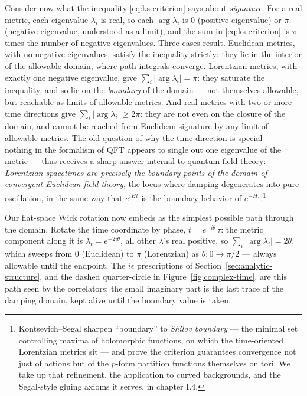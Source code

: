 \noin Consider now what the inequality \eqref{eq:ks-criterion} says about
\emph{signature}. For a real metric, each eigenvalue $\lambda_i$ is real, so
each $\arg\lambda_i$ is $0$ (positive eigenvalue) or $\pi$ (negative
eigenvalue, understood as a limit), and the sum in \eqref{eq:ks-criterion}
is $\pi$ times the number of negative eigenvalues. Three cases result.
Euclidean metrics, with no negative eigenvalues, satisfy the inequality
strictly: they lie in the interior of the allowable domain, where path
integrals converge. Lorentzian metrics, with exactly one negative
eigenvalue, give $\sum_i|\arg\lambda_i| = \pi$: they saturate the
inequality, and so lie on the \emph{boundary} of the domain --- not
themselves allowable, but reachable as limits of allowable metrics. And
real metrics with two or more time directions give $\sum_i |\arg\lambda_i|
\ge 2\pi$: they are not even on the closure of the domain, and cannot be
reached from Euclidean signature by any limit of allowable metrics. The
old question of why the time direction is special --- nothing in the
formalism of QFT appears to single out one eigenvalue of the metric ---
thus receives a sharp answer internal to quantum field theory:
\emph{Lorentzian spacetimes are precisely the boundary points of the domain
of convergent Euclidean field theory}, the locus where damping degenerates
into pure oscillation, in the same way that $e^{iHt}$ is the boundary
behavior of $e^{-H\tau}$.\footnote{Kontsevich--Segal sharpen ``boundary'' to
\emph{Shilov boundary} --- the minimal set controlling maxima of holomorphic
functions, on which the time-oriented Lorentzian metrics sit --- and prove
the criterion guarantees convergence not just of actions but of the
$p$-form partition functions themselves on tori. We take up that refinement,
the application to curved backgrounds, and the Segal-style gluing axioms it
serves, in chapter I.4.}

Our flat-space Wick rotation now embeds as the simplest possible path through
the domain. Rotate the time coordinate by phase, $t = e^{-i\theta}\,\tau$: the
metric component along it is $\lambda_t = e^{-2i\theta}$, all other
$\lambda$'s real positive, so $\sum_i|\arg\lambda_i| = 2\theta$, which sweeps
from $0$ (Euclidean) to $\pi$ (Lorentzian) as $\theta\colon 0 \to \pi/2$ ---
always allowable until the endpoint. The $i\epsilon$ prescriptions of
Section~\ref{sec:analytic-structure}, and the dashed quarter-circle in
Figure~\ref{fig:complex-time}, are this path seen by the correlators: the
small imaginary part is the last trace of the damping domain, kept alive until
the boundary value is taken.

